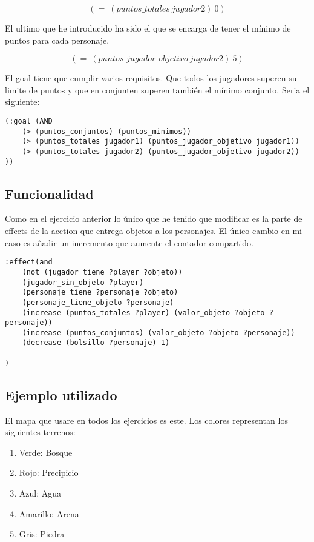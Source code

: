 \documentclass[]{article}
\begin{document}
	$$
	(=\ (puntos\_totales\ jugador2)\ 0)
	$$
	
	El ultimo que he introducido ha sido el que se encarga de tener el mínimo de puntos para cada personaje. 
	
	$$
	(=\ (puntos\_jugador\_objetivo\ jugador2)\ 5)
	$$
	
	El goal tiene que cumplir varios requisitos. Que todos los jugadores superen su limite de puntos y que en conjunten superen también el mínimo conjunto. Seria el siguiente:
\begin{lstlisting}
(:goal (AND
	(> (puntos_conjuntos) (puntos_minimos))
	(> (puntos_totales jugador1) (puntos_jugador_objetivo jugador1))
	(> (puntos_totales jugador2) (puntos_jugador_objetivo jugador2))
))
\end{lstlisting}	
	
	
	
	
	\subsection{Funcionalidad}
	Como en el ejercicio anterior lo único que he tenido que modificar es la parte de effects de la acction que entrega objetos a los personajes. El único cambio en mi caso es añadir un incremento que aumente el contador compartido.
	
	
	\begin{lstlisting}
:effect(and 
	(not (jugador_tiene ?player ?objeto))
	(jugador_sin_objeto ?player)
	(personaje_tiene ?personaje ?objeto)
	(personaje_tiene_objeto ?personaje)
	(increase (puntos_totales ?player) (valor_objeto ?objeto ?personaje))
	(increase (puntos_conjuntos) (valor_objeto ?objeto ?personaje))
	(decrease (bolsillo ?personaje) 1)

)
	\end{lstlisting}

\subsection{Ejemplo utilizado}
El mapa que usare en todos los ejercicios es este. Los colores representan los siguientes terrenos:
\begin{enumerate}
	\item{Verde:} Bosque
	\item{Rojo:} Precipicio
	\item{Azul:} Agua
	\item{Amarillo:} Arena
	\item{Gris:} Piedra
\end{enumerate}
\end{document}
